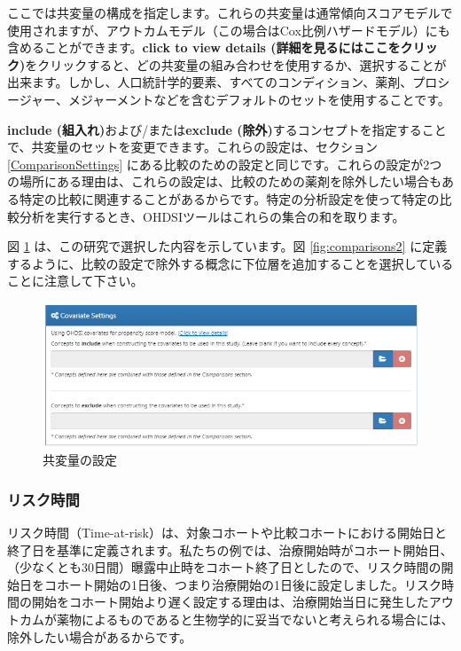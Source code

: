 \documentclass[
  11pt]{book}
\theoremstyle{definition}
\theoremstyle{definition}
\theoremstyle{definition}
\theoremstyle{definition}
\theoremstyle{remark}
\begin{document}
ここでは共変量の構成を指定します。これらの共変量は通常傾向スコアモデルで使用されますが、アウトカムモデル（この場合はCox比例ハザードモデル）にも含めることができます。\textbf{click to view details (詳細を見るにはここをクリック)}をクリックすると、どの共変量の組み合わせを使用するか、選択することが出来ます。しかし、人口統計学的要素、すべてのコンディション、薬剤、プロシージャー、メジャーメントなどを含むデフォルトのセットを使用することです。

\textbf{include (組入れ)}および/または\textbf{exclude (除外)}するコンセプトを指定することで、共変量のセットを変更できます。これらの設定は、セクション \ref{ComparisonSettings} にある比較のための設定と同じです。これらの設定が2つの場所にある理由は、これらの設定は、比較のための薬剤を除外したい場合もある特定の比較に関連することがあるからです。特定の分析設定を使って特定の比較分析を実行するとき、OHDSIツールはこれらの集合の和を取ります。

図 \ref{fig:covariateSettings} は、この研究で選択した内容を示しています。図 \ref{fig:comparisons2} に定義するように、比較の設定で除外する概念に下位層を追加することを選択していることに注意して下さい。

\begin{figure}

{\centering \includegraphics[width=1\linewidth]{images/PopulationLevelEstimation/covariateSettings} 

}

\caption{共変量の設定}\label{fig:covariateSettings}
\end{figure}

\subsubsection*{リスク時間}\label{ux30eaux30b9ux30afux6642ux9593}

リスク時間（Time-at-risk）は、対象コホートや比較コホートにおける開始日と終了日を基準に定義されます。私たちの例では、治療開始時がコホート開始日、（少なくとも30日間）曝露中止時をコホート終了日としたので、リスク時間の開始日をコホート開始の1日後、つまり治療開始の1日後に設定しました。リスク時間の開始をコホート開始より遅く設定する理由は、治療開始当日に発生したアウトカムが薬物によるものであると生物学的に妥当でないと考えられる場合には、除外したい場合があるからです。
\end{document}
